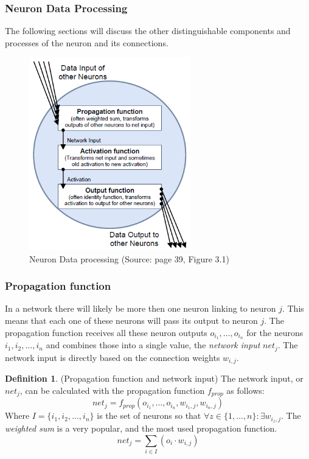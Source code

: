 \documentclass[pdftex,a4paper,12pt,twoside]{report}
\theoremstyle{plain} \newtheorem{theorem}{Theorem} \newtheorem{proposition}{Proposition} \newtheorem{lemma}{Lemma} \newtheorem*{corollary}{Corollary}
\theoremstyle{definition} \newtheorem{definition}{Definition} \newtheorem{conjecture}{Conjecture} \newtheorem*{example}{Example} \newtheorem{algorithm}{Algorithm}
\theoremstyle{remark} \newtheorem*{remark}{Remark} \newtheorem*{note}{Note} \newtheorem{case}{Case}
\begin{document}
\subsubsection{Neuron Data Processing}
The following sections will discuss the other distinguishable components and processes of the neuron and its connections.
\begin{figure}
\centering
\includegraphics[width=7cm]{./img/Neuron_Dataprocessing.png}
\caption{Neuron Data processing (Source: \citep{Kriesel2013} page 39, Figure 3.1)}
\end{figure}
\subsubsection{Propagation function}
In a network there will likely be more then one neuron linking to neuron $j$. This means that each one of these neurons will pass its output to neuron $j$. The propagation function receives all these neuron outputs $o_{i_{1}},\dotsc,o_{i_{n}}$ for the neurons $i_1,i_2,\dotsc,i_n$ and combines those into a single value, the \emph{network input} $net_j$. The network input is directly based on the connection weights $w_{i,j}$.
\begin{definition}
(Propagation function and network input) The network input, or $net_j$, can be calculated with the propagation function $f _{prop}$ as follows:
\begin{equation}
net_j = f _{prop}(o_{i_{1}},\dotsc,o_{i_{n}},w_{i_{1},j},w_{i_{n},j})
\end{equation}
Where $I = \{i_1,i_2,\dotsc,i_n\}$ is the set of neurons so that $\forall z \in \{1,\dotsc,n\} : \exists w_{i_{z},j}$. The \emph{weighted sum} is a very popular, and the most used propagation function.
\begin{equation}
net_j = \sum_{i \in I}(o_i \cdot w_{i,j})
\end{equation}
\end{definition}
\end{document}

